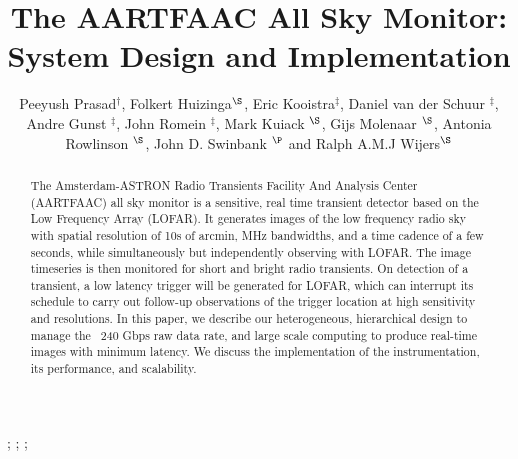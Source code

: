 \documentclass{ws-jai}
\begin{document}
\catchline{}{}{}{}{} %


\title{The AARTFAAC All Sky Monitor: System Design and Implementation}

\author{Peeyush      Prasad$^\dagger$,      Folkert     Huizinga$^\S$,      Eric
  Kooistra$^\ddagger$,   Daniel  van   der  Schuur   $^\ddagger$,  Andre   Gunst
  $^\ddagger$, John Romein $^\ddagger$, Mark  Kuiack $^\S$, Gijs Molenaar $^\S$,
  Antonia Rowlinson $^\S$, John D. Swinbank $^\P$ and Ralph A.M.J Wijers$^\S$}

\address{   $^\dagger$Anton  Pannekoek   Institute,  University   of  Amsterdam, Postbus 94249
1090 GE,
  Amsterdam,   The   Netherlands,  p.prasad@uva.nl\\   $^\ddagger$ASTRON,   Oude
  Hoogeveensedijk,  7991PD, The  Netherlands\\  $^\S$Anton Pannekoek  Institute,
  University  of  Amsterdam, Postbus 94249
1090 GE,  Amsterdam, The  Netherlands\\  $^\P$Department  of
  Astrophysical Sciences, Princeton University, Princeton, NJ 08544, USA\\ }

\maketitle


\begin{history}
;
;
;
\end{history}

\begin{abstract}
The Amsterdam-ASTRON  Radio Transients  Facility And Analysis  Center (AARTFAAC)
all sky monitor  is a sensitive, real  time transient detector based  on the Low
Frequency Array  (LOFAR).  It generates  images of  the low frequency  radio sky
with spatial resolution of 10s of arcmin,  MHz bandwidths, and a time cadence of
a few seconds, while simultaneously but independently observing with LOFAR.  The
image timeseries  is then monitored  for short  and bright radio  transients. On
detection of  a transient, a  low latency trigger  will be generated  for LOFAR,
which can  interrupt its  schedule to  carry out  follow-up observations  of the
trigger  location  at high  sensitivity  and  resolutions.   In this  paper,  we
describe our heterogeneous, hierarchical design to manage the ~240 Gbps raw data
rate,  and  large scale  computing  to  produce  real-time images  with  minimum
latency.  We discuss the implementation of the instrumentation, its performance,
and scalability.
\end{abstract}
\end{document}
